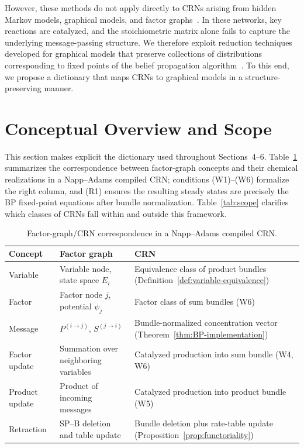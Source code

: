 \documentclass{article}
\theoremstyle{plain}
\theoremstyle{definition}
\theoremstyle{remark}
\newcommand{\<}{\langle}
\renewcommand{\>}{\rangle}
\begin{document}

However, these methods do not apply directly to CRNs arising from hidden Markov models, graphical models, and factor graphs~\cite{10.1098/rsif.2022.0877, NIPS2013_e5e63da7, COLLIAUX2017385}. In these networks, key reactions are catalyzed, and the stoichiometric matrix alone fails to capture the underlying message-passing structure. We therefore exploit reduction techniques developed for graphical models that preserve collections of distributions corresponding to fixed points of the belief propagation algorithm~\cite{sergeantperthuis2025minimacriticalpointsbethe, NIPS2000_61b1fb3f}. To this end, we propose a dictionary that maps CRNs to graphical models in a structure-preserving manner.

\section{Conceptual Overview and Scope}
\label{app:overview}

This section makes explicit the dictionary used throughout 
Sections~4--6. Table~\ref{tab:correspondence} summarizes the 
correspondence between factor-graph concepts and their chemical 
realizations in a Napp--Adams compiled CRN; conditions (W1)--(W6) 
formalize the right column, and (R1) ensures the resulting 
steady states are precisely the BP fixed-point equations after 
bundle normalization. Table~\ref{tab:scope} clarifies which 
classes of CRNs fall within and outside this framework.

\begin{table}[h]
\centering
\small
\caption{Factor-graph/CRN correspondence in a Napp--Adams 
compiled CRN.}
\label{tab:correspondence}
\begin{tabular}{p{2.0cm}p{3.2cm}p{3.2cm}}
\toprule
\textbf{Concept}
    & \textbf{Factor graph}
    & \textbf{CRN} \\
\midrule
Variable
    & Variable node, state space $E_i$
    & Equivalence class of product bundles
      (Definition~\ref{def:variable-equivalence}) \\[4pt]
Factor
    & Factor node $j$, potential $\psi_j$
    & Factor class of sum bundles (W6) \\[4pt]
Message
    & $P^{(i \to j)}$,\; $S^{(j \to i)}$
    & Bundle-normalized concentration
      vector (Theorem~\ref{thm:BP-implementation}) \\[4pt]
Factor update
    & Summation over neighboring variables
    & Catalyzed production into sum bundle
      (W4, W6) \\[4pt]
Product update
    & Product of incoming messages
    & Catalyzed production into product
      bundle (W5) \\[4pt]
Retraction
    & SP--B deletion and table update
    & Bundle deletion plus rate-table
      update (Proposition~\ref{prop:functoriality}) \\
\bottomrule
\end{tabular}
\end{table}
\end{document}
